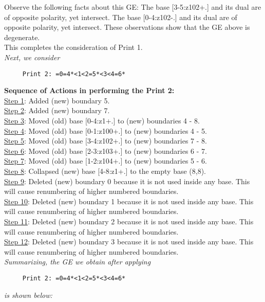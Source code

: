 \documentclass[final]{article}
\begin{document}
Observe the following facts about this GE:
The base [3-5:z102+.]  and its dual are of opposite polarity, yet intersect.  The base [0-4:z102-.]  and its dual are of opposite polarity, yet intersect.  These observations show that the GE above is degenerate.\\[0.1in]
This completes the consideration of Print 1.\\[0.1in]
{\em Next, we consider}
\begin{verbatim}
     Print 2: =0=4*<1<2=5*<3<4=6*
\end{verbatim}
{\bf Sequence of Actions in performing the Print 2:}\\
{\underline{Step 1}:} Added (new) boundary 5.\\
{\underline{Step 2}:} Added (new) boundary 7.\\
{\underline{Step 3}:} Moved (old) base [0-4:z1+.]  to (new) boundaries 4 - 8.\\
{\underline{Step 4}:} Moved (old) base [0-1:z100+.]  to (new) boundaries 4 - 5.\\
{\underline{Step 5}:} Moved (old) base [3-4:z102+.]  to (new) boundaries 7 - 8.\\
{\underline{Step 6}:} Moved (old) base [2-3:z103+.]  to (new) boundaries 6 - 7.\\
{\underline{Step 7}:} Moved (old) base [1-2:z104+.]  to (new) boundaries 5 - 6.\\
{\underline{Step 8}:} Collapsed (new) base [4-8:z1+.]  to the empty base (8,8).
\\
{\underline{Step 9}:} Deleted (new) boundary 0 because it is not used inside any base.  This will cause renumbering of higher numbered boundaries.
\\
{\underline{Step 10}:} Deleted (new) boundary 1 because it is not used inside any base.  This will cause renumbering of higher numbered boundaries.
\\
{\underline{Step 11}:} Deleted (new) boundary 2 because it is not used inside any base.  This will cause renumbering of higher numbered boundaries.
\\
{\underline{Step 12}:} Deleted (new) boundary 3 because it is not used inside any base.  This will cause renumbering of higher numbered boundaries.
\\[0.1in]
{\em Summarizing, the GE we obtain after applying}
\begin{verbatim}
     Print 2: =0=4*<1<2=5*<3<4=6*
\end{verbatim}
{\em is shown below:}
\end{document}
